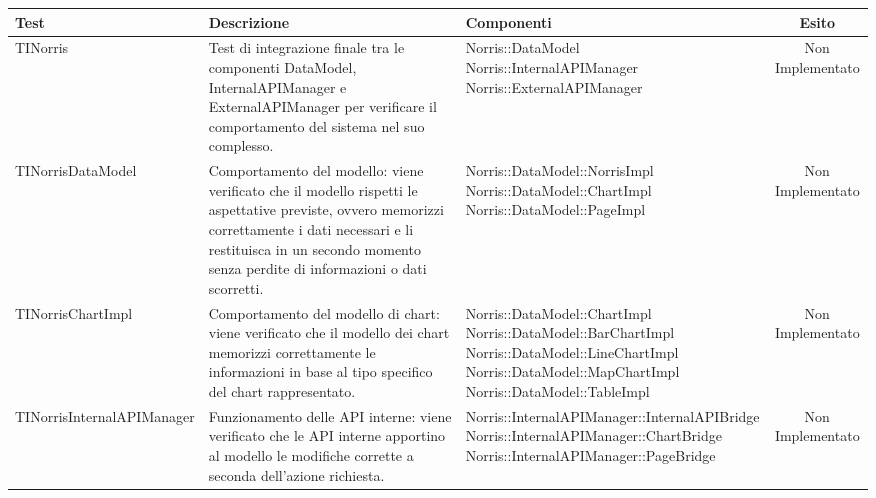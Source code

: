 \begin{table}[H]
	\begin{center}
		\begin{longtabu}{| X | X | X | c |}
			\hline
			Test 					& Descrizione				& Componenti				 & Esito 					\\ \hline




	TINorris
	&
Test di integrazione finale tra le componenti DataModel, InternalAPIManager e ExternalAPIManager per verificare il comportamento del sistema nel suo complesso.
& \parbox[t]{0.4\textwidth}{
Norris::DataModel\\
Norris::InternalAPIManager\\
Norris::ExternalAPIManager}
			& Non Implementato
			\\ \hline



	TINorrisDataModel
	&
Comportamento del modello: viene verificato che il modello rispetti le aspettative previste, ovvero memorizzi correttamente i dati necessari e li restituisca in un secondo momento senza perdite di informazioni o dati scorretti.
& \parbox[t]{0.4\textwidth}{
Norris::DataModel::NorrisImpl\\
Norris::DataModel::ChartImpl\\
Norris::DataModel::PageImpl}
			& Non Implementato
			\\ \hline



	TINorrisChartImpl
	&
Comportamento del modello di chart: viene verificato che il modello dei chart memorizzi correttamente le informazioni in base al tipo specifico del chart rappresentato.
& \parbox[t]{0.4\textwidth}{
Norris::DataModel::ChartImpl\\
Norris::DataModel::BarChartImpl\\
Norris::DataModel::LineChartImpl\\
Norris::DataModel::MapChartImpl\\
Norris::DataModel::TableImpl}
			& Non Implementato
			\\ \hline



	TINorrisInternalAPIManager
	&
Funzionamento delle API interne: viene verificato che le API interne apportino al modello le modifiche corrette a seconda dell'azione richiesta.
& \parbox[t]{0.4\textwidth}{
Norris::InternalAPIManager::InternalAPIBridge\\
Norris::InternalAPIManager::ChartBridge\\
Norris::InternalAPIManager::PageBridge}
			& Non Implementato
			\\ \hline




\end{longtabu}
\end{center}
\end{table}
